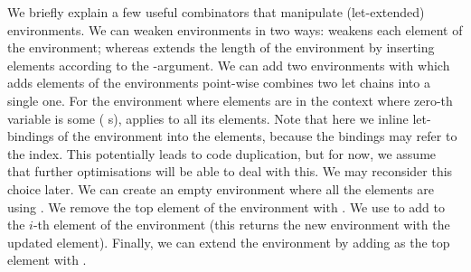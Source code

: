 We briefly explain a few useful combinators that manipulate (let-extended) environments.
We can weaken environments in two ways:  weakens each element of the environment;
whereas  extends the length of the environment by inserting 
elements according to the -argument.  We can add two environments with 
which adds elements of the environments point-wise combines two let chains into a single
one.  For the environment where elements are in the context where zero-th variable
is some ( s),  applies  to all its elements.  Note that
here we inline let-bindings of the environment into the elements, because the bindings
may refer to the index.  This potentially leads to code duplication, but for now, we
assume that further optimisations will be able to deal with this.  We may reconsider
this choice later.  We can create an empty environment where all the elements are
 using .  We remove the top element of the environment with
.  We use     to add to the $i$-th
element of the environment (this returns the new environment with the updated element).
Finally, we can extend the environment by adding  as the top element with
.
